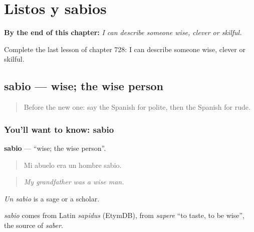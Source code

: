 
\chapter{Listos y sabios}
\label{ch:es-listos-y-sabios}

\begin{chapteropening}
\textbf{By the end of this chapter:} \emph{I can describe someone wise, clever or skilful.}

Complete the last lesson of chapter 728: I can describe someone wise, clever or skilful.
\end{chapteropening}

\section[sabio]{sabio — wise; the wise person}

\label{lesson:ES-C728-sabio}



\begin{quote}
Before the new one: say the Spanish for polite, then the Spanish for rude.
\end{quote}

\subsection*{You'll want to know: sabio}
\textbf{sabio} — \textquotedblleft{}wise; the wise person\textquotedblright{}.

\begin{quote}
Mi abuelo era un hombre sabio.
\end{quote}

\begin{quote}
\emph{My grandfather was a wise man.}
\end{quote}

\emph{Un sabio} is a sage or a scholar.

\begin{cousinweb}
\emph{sabio} comes from Latin \emph{sapidus} (EtymDB), from \emph{sapere} \textquotedblleft{}to taste, to be wise\textquotedblright{}, the source of \emph{saber}.
\end{cousinweb}

